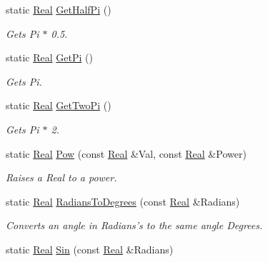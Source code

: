 \begin{DoxyCompactItemize}
static \hyperlink{namespaceMezzanine_a726731b1a7df72bf3583e4a97282c6f6}{Real} \hyperlink{classMezzanine_1_1MathTool_afeaaaf9f445283c16310b4f15c44d03e}{GetHalfPi} ()
\begin{DoxyCompactList}\small\item\em Gets Pi $\ast$ 0.5. \item\end{DoxyCompactList}\item 
static \hyperlink{namespaceMezzanine_a726731b1a7df72bf3583e4a97282c6f6}{Real} \hyperlink{classMezzanine_1_1MathTool_a041b328e51d402deda1660b6d30508f5}{GetPi} ()
\begin{DoxyCompactList}\small\item\em Gets Pi. \item\end{DoxyCompactList}\item 
static \hyperlink{namespaceMezzanine_a726731b1a7df72bf3583e4a97282c6f6}{Real} \hyperlink{classMezzanine_1_1MathTool_afd4da5be9f2f1f89dfa92235a5b02307}{GetTwoPi} ()
\begin{DoxyCompactList}\small\item\em Gets Pi $\ast$ 2. \item\end{DoxyCompactList}\item 
static \hyperlink{namespaceMezzanine_a726731b1a7df72bf3583e4a97282c6f6}{Real} \hyperlink{classMezzanine_1_1MathTool_ad38737da349c0aea453d42f79e5c61d1}{Pow} (const \hyperlink{namespaceMezzanine_a726731b1a7df72bf3583e4a97282c6f6}{Real} \&Val, const \hyperlink{namespaceMezzanine_a726731b1a7df72bf3583e4a97282c6f6}{Real} \&Power)
\begin{DoxyCompactList}\small\item\em Raises a Real to a power. \item\end{DoxyCompactList}\item 
static \hyperlink{namespaceMezzanine_a726731b1a7df72bf3583e4a97282c6f6}{Real} \hyperlink{classMezzanine_1_1MathTool_a743191c57f5b98ce558a7197492c2f4b}{RadiansToDegrees} (const \hyperlink{namespaceMezzanine_a726731b1a7df72bf3583e4a97282c6f6}{Real} \&Radians)
\begin{DoxyCompactList}\small\item\em Converts an angle in Radians's to the same angle Degrees. \item\end{DoxyCompactList}\item 
static \hyperlink{namespaceMezzanine_a726731b1a7df72bf3583e4a97282c6f6}{Real} \hyperlink{classMezzanine_1_1MathTool_a58b35317198c5d4cdf1680e5516747c3}{Sin} (const \hyperlink{namespaceMezzanine_a726731b1a7df72bf3583e4a97282c6f6}{Real} \&Radians)

\end{DoxyCompactItemize}
